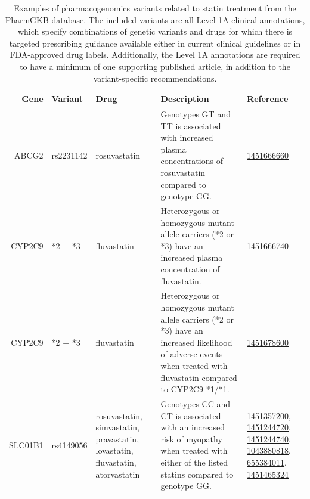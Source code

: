 \begin{table}[t]
\footnotesize
\centering
\tlfstyle
\begin{tabularx}{\linewidth}{r l p{3cm} X p{3.1cm}} 
\toprule
Gene & Variant & Drug & Description & Reference \\ 
\midrule

ABCG2 
& rs2231142
& rosuvastatin 
& Genotypes GT and TT is associated with increased plasma concentrations of 
rosuvastatin compared to genotype GG. 
&  \href{https://www.pharmgkb.org/clinicalAnnotation/1451666660}{1451666660}
\\

CYP2C9 
& *2 + *3 
& fluvastatin 
& Heterozygous or homozygous mutant allele carriers (*2 or *3) 
have an increased plasma concentration of fluvastatin.
& \href{https://www.pharmgkb.org/clinicalAnnotation/1451666740}{1451666740}
\\

CYP2C9 
& *2 + *3 
& fluvastatin 
& Heterozygous or homozygous mutant allele carriers (*2 or *3) 
have an increased likelihood of adverse events
when treated with fluvastatin compared to CYP2C9 *1/*1. 
&  \href{https://www.pharmgkb.org/clinicalAnnotation/1451678600}{1451678600}
\\

SLC01B1 
& rs4149056 
& rosuvastatin, simvastatin, pravastatin, lovastatin, fluvastatin, atorvastatin
& Genotypes CC and CT is associated with an increased risk of myopathy
when treated with either of the listed statins compared to genotype GG.
& \href{https://www.pharmgkb.org/clinicalAnnotation/1451357200}{1451357200},
\href{https://www.pharmgkb.org/clinicalAnnotation/1451244720}{1451244720},
\href{https://www.pharmgkb.org/clinicalAnnotation/1451244740}{1451244740},
\href{https://www.pharmgkb.org/clinicalAnnotation/1043880818}{1043880818},
\href{https://www.pharmgkb.org/clinicalAnnotation/655384011}{655384011},
\href{https://www.pharmgkb.org/clinicalAnnotation/1451465324}{1451465324}
\\

\bottomrule
\end{tabularx}
\caption[Example statin pharmacogenomic variants]{
	Examples of pharmacogenomics variants related to statin treatment 
	from the PharmGKB database.
	The included variants are all Level 1A clinical annotations, 
	which specify combinations of genetic variants and drugs for which there 
	is targeted prescribing guidance available either in
	current clinical guidelines or in FDA-approved drug labels. 
	Additionally, the Level 1A annotations are required to have a
	minimum of one supporting published article, in addition to the
	variant-specific recommendations.
 }
\label{tab:pgxvars}
\end{table}%

